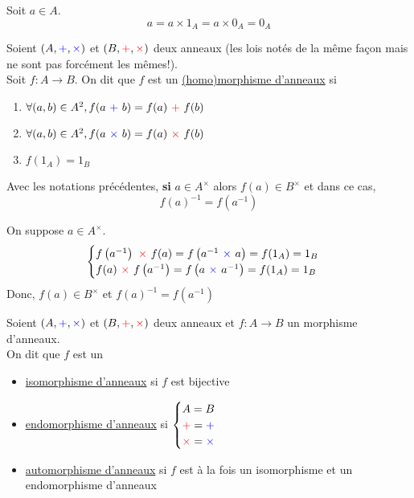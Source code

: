 \begin{prv}
	Soit $a \in A$. \[
		a = a \times 1_A = a \times 0_A = 0_A
	\] 
\end{prv}

\newcommand{\red}[1]{{\color{red} #1}}
\newcommand{\blue}[1]{{\color{blue} #1}}

\begin{defn}
	Soient $(A, \blue+, \blue\times)$ et $(B, \red+, \red\times)$ deux anneaux (les lois notés de la même fa\c con mais ne sont pas forcément les mêmes!).\\
	Soit $f: A \to B$. On dit que $f$ est un \underline{(homo)morphisme d'anneaux} si
	\begin{enumerate}
		\item $\forall (a,b) \in A^2, f(a ~\blue+~ b) = f(a) ~\red+~ f(b)$
		\item $\forall (a,b) \in A^2, f(a ~\blue\times~ b) = f(a) ~\red\times~ f(b)$
		\item $f(1_A) = 1_B$
	\end{enumerate}
\end{defn}

\begin{prop}
	Avec les notations précédentes, {\bf si}  $a \in A^\times$ alors $f(a) \in B^\times$ et dans ce cas,  \[
		f(a)^{-1} = f\left( a^{-1} \right) 
	\] 
\end{prop}

\begin{prv}
	On suppose $a \in A^\times$. \[
	\begin{cases}
		f\left( a^{-1} \right) ~\red\times~ f(a) = f\left( a^{-1} ~\blue\times~ a \right) = f(1_A) = 1_B\\
		f(a) ~\red\times~ f\left( a^{-1} \right)= f\left(a ~\blue\times~  a^{-1} \right) = f(1_A) = 1_B\\
	\end{cases}
	\]
	Donc, $f(a) \in B^\times$ et $f(a)^{-1}= f\left( a^{-1} \right)$
\end{prv}

\begin{defn}
	Soient $(A,\blue+, \blue\times)$ et $(B, \red+, \red\times)$ deux anneaux et $f: A \to B$ un morphisme d'anneaux.\\
	On dit que $f$ est un
	\begin{itemize}
		\item \underline{isomorphisme d'anneaux} si $f$ est bijective
		\item \underline{endomorphisme d'anneaux} si $\begin{cases}
				A = B\\
				\red+ = \blue+\\
				\red\times = \blue\times 
			\end{cases}$ 
		\item \underline{automorphisme d'anneaux} si $f$ est à la fois un isomorphisme et un endomorphisme d'anneaux
	\end{itemize}
\end{defn}

